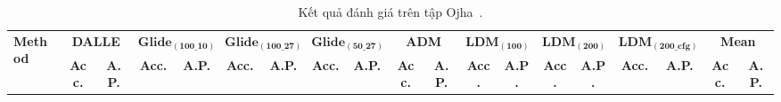 \begin{table}[ht!]%
	\caption{Kết quả đánh giá trên tập Ojha~\cite{Ojha2023TowardsUF}.}
	\label{tab:table4}
	\centering
	\begin{adjustbox}{max width=\textwidth}
		\begin{tabular}{l cc cc cc cc cc cc cc cc|cc}
			\hline
			\multirow{2}{*}{{\textbf{Method}}} & \multicolumn{2}{c}{\textbf{DALLE}} & \multicolumn{2}{c}{$\mathbf{{Glide_{(100\_10)}}}$} & \multicolumn{2}{c}{$\mathbf{{Glide_{(100\_27)}}}$} & \multicolumn{2}{c}{$\mathbf{{Glide_{(50\_27)}}}$} & \multicolumn{2}{c}{\textbf{ADM}} & \multicolumn{2}{c}{$\mathbf{{LDM_{(100)}}}$} & \multicolumn{2}{c}{$\mathbf{{LDM_{(200)}}}$} & \multicolumn{2}{c|}{$\mathbf{{LDM_{(200\_cfg)}}}$} & \multicolumn{2}{c}{\textbf{Mean}} \\
			\cline{2-19}
			& {\textbf{Acc.}} & {\textbf{A.P.}} & {\textbf{Acc.}} & {\textbf{A.P.}} & {\textbf{Acc.}} & {\textbf{A.P.}} & {\textbf{Acc.}} & {\textbf{A.P.}} & {\textbf{Acc.}} & {\textbf{A.P.}} & {\textbf{Acc.}} & {\textbf{A.P.}} & {\textbf{Acc.}} & {\textbf{A.P.}} & {\textbf{Acc.}} & {\textbf{A.P.}} & {\textbf{Acc.}} & {\textbf{A.P.}} \\
			

\end{tabular}
\end{adjustbox}
\end{table}
